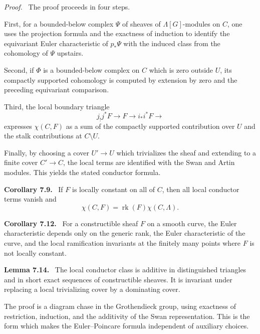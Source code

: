 \documentclass[11pt]{article}
\theoremstyle{plain}
\theoremstyle{definition}
\theoremstyle{remark}
\newenvironment{statement}[1]{\par\medskip\noindent\textbf{#1.}\ }{\par\medskip}
\newenvironment{prooftext}{\par\noindent\textit{Proof.}\ }{\par\medskip}
\begin{document}
\begin{prooftext}
The proof proceeds in four steps.

First, for a bounded-below complex $\Psi$ of sheaves of $\Lambda[G]$-modules on $C$, one uses the projection formula and the exactness of induction to identify the equivariant Euler characteristic of $p_*\Psi$ with the induced class from the cohomology of $\Psi$ upstairs.

Second, if $\Phi$ is a bounded-below complex on $C$ which is zero outside $U$, its compactly supported cohomology is computed by extension by zero and the preceding equivariant comparison.

Third, the local boundary triangle
\[
   j_!j^*F\to F\to i_*i^*F\to
\]
expresses $\chi(C,F)$ as a sum of the compactly supported contribution over $U$ and the stalk contributions at $C\setminus U$.

Finally, by choosing a cover $U'\to U$ which trivializes the sheaf and extending to a finite cover $C'\to C$, the local terms are identified with the Swan and Artin modules. This yields the stated conductor formula.
\end{prooftext}

\begin{statement}{Corollary 7.9}
If $F$ is locally constant on all of $C$, then all local conductor terms vanish and
\[
   \chi(C,F)=\operatorname{rk}(F)\chi(C,\Lambda).
\]
\end{statement}

\begin{statement}{Corollary 7.12}
For a constructible sheaf $F$ on a smooth curve, the Euler characteristic depends only on the generic rank, the Euler characteristic of the curve, and the local ramification invariants at the finitely many points where $F$ is not locally constant.
\end{statement}

\begin{statement}{Lemma 7.14}
The local conductor class is additive in distinguished triangles and in short exact sequences of constructible sheaves. It is invariant under replacing a local trivializing cover by a dominating cover.
\end{statement}

The proof is a diagram chase in the Grothendieck group, using exactness of restriction, induction, and the additivity of the Swan representation. This is the form which makes the Euler--Poincare formula independent of auxiliary choices.
\end{document}
